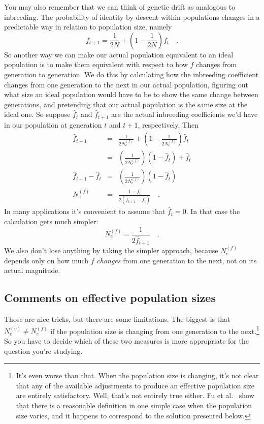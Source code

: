 You may also remember that we can think of genetic drift as analogous
to inbreeding. The probability of identity by descent within
populations changes in a predictable way in relation to population
size, namely
\[
f_{t+1}
   = \frac{1}{2N} + \left(1 - \frac{1}{2N}\right)f_t \quad.
\]
So another way we can make our actual population equivalent to an
ideal population is to make them equivalent with respect to how $f$
changes from generation to generation. We do this by calculating how
the inbreeding coefficient changes from one generation to the next in
our actual population, figuring out what size an ideal population
would have to be to show the same change between generations, and
pretending that our actual population is the same size at the ideal
one. So suppose $\hat f_t$ and $\hat f_{t+1}$ are the actual
inbreeding coefficients we'd have in our population at generation $t$
and $t+1$, respectively. Then
\begin{eqnarray*}
\hat f_{t+1} &=& \frac{1}{2N_e^{(f)}} + \left(1 -
        \frac{1}{2N_e^{(f)}}\right)\hat f_t \\
        &=& \left(\frac{1}{2N_e^{(f)}}\right)(1 - \hat f_t) + \hat f_t \\
\hat f_{t+1} - \hat f_t &=& \left(\frac{1}{2N_e^{(f)}}\right)(1 - \hat
        f_t) \\
N_e^{(f)} &=& \frac{1 - \hat f_t}{2(\hat f_{t+1} - \hat f_t)} \quad .
\end{eqnarray*}
In many applications it's convenient to assume that $\hat f_t = 0$. In
that case the calculation gets much simpler:
\[
N_e^{(f)} = \frac{1}{2\hat f_{t+1}} \quad .
\]
We also don't lose anything by taking the simpler approach, because
$N_e^{(f)}$ depends only on how much $f$ {\it changes\/} from one
generation to the next, not on its actual magnitude.

\subsection*{Comments on effective population sizes}

Those are nice tricks, but there are some limitations. The biggest is
that $N_e^{(v)} \ne N_e^{(f)}$ if the population size is changing from
one generation to the next.\footnote{It's even worse than that. When
  the population size is changing, it's not clear that any of the
  available adjustments to produce an effective population size are
  entirely satisfactory. Well, that's not entirely true either. Fu et
  al.~\cite{Fu-etal-2003} show that there is a reasonable definition
  in one simple case when the population size varies, and it happens
  to correspond to the solution presented below.} So you have to
decide which of these two measures is more appropriate for the
question you're studying.

